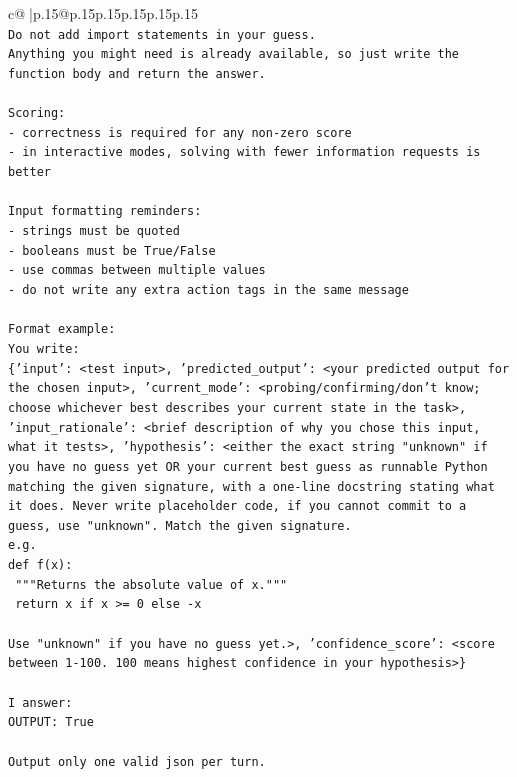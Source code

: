 \documentclass{article}
\begin{document}
{\begin{supertabular}{c@{$\;$}|p{.15\linewidth}@{}p{.15\linewidth}p{.15\linewidth}p{.15\linewidth}p{.15\linewidth}p{.15\linewidth}}
{{{\\ 
\texttt{Do not add import statements in your guess.} \\
\texttt{Anything you might need is already available, so just write the function body and return the answer.} \\
\\ 
\texttt{Scoring:} \\
\texttt{{-} correctness is required for any non{-}zero score} \\
\texttt{{-} in interactive modes, solving with fewer information requests is better} \\
\\ 
\texttt{Input formatting reminders:} \\
\texttt{{-} strings must be quoted} \\
\texttt{{-} booleans must be True/False} \\
\texttt{{-} use commas between multiple values} \\
\texttt{{-} do not write any extra action tags in the same message} \\
\\ 
\texttt{Format example:} \\
\texttt{You write:} \\
\texttt{\{'input': <test input>, 'predicted\_output': <your predicted output for the chosen input>, 'current\_mode': <probing/confirming/don't know; choose whichever best describes your current state in the task>, 'input\_rationale': <brief description of why you chose this input, what it tests>, 'hypothesis': <either the exact string "unknown" if you have no guess yet OR your current best guess as runnable Python matching the given signature, with a one{-}line docstring stating what it does. Never write placeholder code, if you cannot commit to a guess, use "unknown". Match the given signature.} \\
\texttt{e.g.} \\
\texttt{def f(x):} \\
\texttt{	"""Returns the absolute value of x."""} \\
\texttt{	return x if x >= 0 else {-}x} \\
\\ 
\texttt{Use "unknown" if you have no guess yet.>, 'confidence\_score': <score between 1{-}100. 100 means highest confidence in your hypothesis>\}} \\
\\ 
\texttt{I answer:} \\
\texttt{OUTPUT: True} \\
\\ 
\texttt{Output only one valid json per turn.} \\
            }
        }
    }
     \\ \\


\end{supertabular}}
\end{document}
